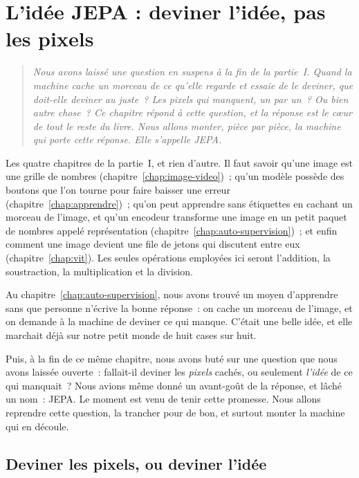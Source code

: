 \chapter{L'idée JEPA : deviner l'idée, pas les pixels}
\label{chap:idee-jepa}

\begin{quote}\itshape
Nous avons laissé une question en suspens à la fin de la partie~I. Quand la
machine cache un morceau de ce qu'elle regarde et essaie de le deviner,
que doit-elle deviner au juste~? Les pixels qui manquent, un par un~? Ou
bien autre chose~? Ce chapitre répond à cette question, et la réponse est
le cœur de tout le reste du livre. Nous allons monter, pièce par pièce, la
machine qui porte cette réponse. Elle s'appelle JEPA.
\end{quote}

\begin{prerequis}
Les quatre chapitres de la partie~I, et rien d'autre. Il faut savoir qu'une
image est une grille de nombres (chapitre~\ref{chap:image-video})~; qu'un
modèle possède des boutons que l'on tourne pour faire baisser une erreur
(chapitre~\ref{chap:apprendre})~; qu'on peut apprendre sans étiquettes en
cachant un morceau de l'image, et qu'un encodeur transforme une image en un
petit paquet de nombres appelé représentation
(chapitre~\ref{chap:auto-supervision})~; et enfin comment une image devient
une file de jetons qui discutent entre eux
(chapitre~\ref{chap:vit}). Les seules opérations employées ici seront
l'addition, la soustraction, la multiplication et la division.
\end{prerequis}

Au chapitre~\ref{chap:auto-supervision}, nous avons trouvé un moyen
d'apprendre sans que personne n'écrive la bonne réponse~: on cache un
morceau de l'image, et on demande à la machine de deviner ce qui manque.
C'était une belle idée, et elle marchait déjà sur notre petit monde de huit
cases sur huit.

Puis, à la fin de ce même chapitre, nous avons buté sur une question que
nous avons laissée ouverte~: fallait-il deviner les \emph{pixels} cachés, ou
seulement \emph{l'idée} de ce qui manquait~? Nous avions même donné un avant-goût
de la réponse, et lâché un nom~: JEPA. Le moment est venu de tenir cette
promesse. Nous allons reprendre cette question, la trancher pour de bon, et
surtout monter la machine qui en découle.

\section{Deviner les pixels, ou deviner l'idée}

